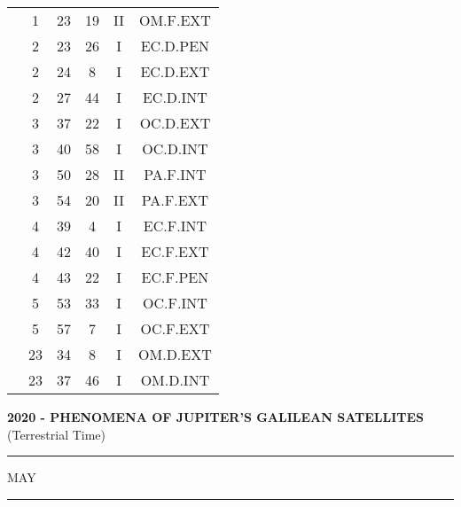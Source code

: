 \documentclass[12pt, a4paper]{article}
\begin{document}
\begin{multicols}{3}
{\begin{tabular}{c c c c c c}
	 	 	 	 & 1 & 23 & 19 & II & OM.F.EXT\\%
	 	 	 	 & 2 & 23 & 26 & I & EC.D.PEN\\%
	 	 	 	 & 2 & 24 & 8 & I & EC.D.EXT\\%
	 	 	 	 & 2 & 27 & 44 & I & EC.D.INT\\%
	 	 	 	 & 3 & 37 & 22 & I & OC.D.EXT\\%
	 	 	 	 & 3 & 40 & 58 & I & OC.D.INT\\%
	 	 	 	 & 3 & 50 & 28 & II & PA.F.INT\\%
	 	 	 	 & 3 & 54 & 20 & II & PA.F.EXT\\%
	 	 	 	 & 4 & 39 & 4 & I & EC.F.INT\\%
	 	 	 	 & 4 & 42 & 40 & I & EC.F.EXT\\%
	 	 	 	 & 4 & 43 & 22 & I & EC.F.PEN\\%
	 	 	 	 & 5 & 53 & 33 & I & OC.F.INT\\%
	 	 	 	 & 5 & 57 & 7 & I & OC.F.EXT\\%
	 	 	 	 & 23 & 34 & 8 & I & OM.D.EXT\\%
	 	 	 	 & 23 & 37 & 46 & I & OM.D.INT\\%
	 	 \end{tabular}
 	}
\end{multicols}
\textbf{2020 - PHENOMENA OF JUPITER'S GALILEAN SATELLITES}\\(Terrestrial Time) 
\vspace{0.1cm} \hrule \vspace{0.1cm}
MAY\vspace{0.1cm}
\hrule
\vspace{-0.2cm}
\end{document}
